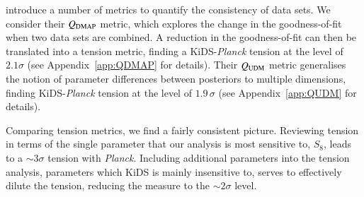 \citet{Raveri2019} introduce a number of metrics to quantify the consistency of data sets.   We consider their $Q_{\rm DMAP}$ metric, which explores the change in the goodness-of-fit when two data sets are combined.   A reduction in the goodness-of-fit can then be translated into a tension metric, finding a KiDS-{\it Planck} tension at the level of $2.1\sigma$ (see Appendix~\ref{app:QDMAP} for details).    
Their $Q_{\rm UDM}$ metric generalises the notion of parameter differences between posteriors to multiple dimensions, finding KiDS-{\it Planck} tension at the level of $1.9\,\sigma$ (see Appendix~\ref{app:QUDM} for details).   

Comparing tension metrics, we find a fairly consistent picture.  Reviewing tension in terms of the single parameter that our \tttp analysis is most sensitive to, $S_8$, leads to a $\sim 3\sigma$ tension with {\it Planck}.   
Including additional parameters into the tension analysis, parameters which KiDS is mainly insensitive to, serves to effectively dilute the tension, reducing the measure to the $\sim 2\sigma$ level.    













